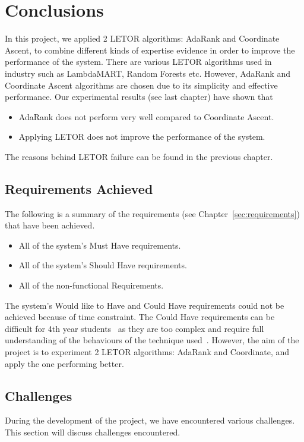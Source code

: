 
\chapter{Conclusions}
In this project, we applied 2 LETOR algorithms: AdaRank and Coordinate Ascent, to combine different kinds of expertise evidence in order 
to improve the performance of the system. There are various LETOR algorithms used in industry such as LambdaMART, Random Forests etc. 
However, AdaRank and Coordinate Ascent algorithms are chosen due to its simplicity and effective performance. Our experimental results (see last chapter) have shown that
\begin{itemize}
 \item AdaRank does not perform very well compared to Coordinate Ascent.
 \item Applying LETOR does not improve the performance of the system.
\end{itemize}

\noindent The reasons behind LETOR failure can be found in the previous chapter.

\section{Requirements Achieved}
The following is a summary of the requirements (see Chapter~\ref{sec:requirements}) that have been achieved.
\begin{itemize}
 \item All of the system's Must Have requirements.
 \item All of the system's Should Have requirements.
 \item All of the non-functional Requirements.
\end{itemize}
The system's Would like to Have and Could Have requirements could not be achieved because of time constraint.
The Could Have requirements can be difficult for 4th year students~\cite{craig} as they are too complex and require full understanding of the 
behaviours of the technique used~\cite{craig}.
However, the aim of the project is to experiment 2 LETOR algorithms: AdaRank and Coordinate, and apply the one performing better.

\section{Challenges}\label{sec:challenges}
During the development of the project, we have encountered various challenges. This section will discuss challenges encountered.

